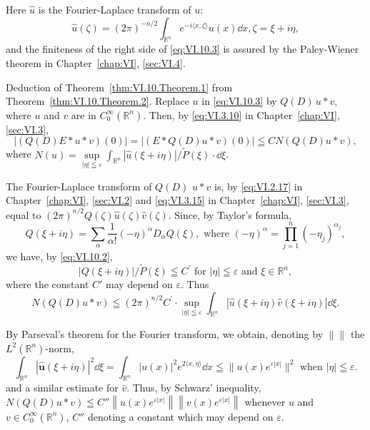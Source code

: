 Here $\hat{u}$ is the Fourier-Laplace transform of $u$: 
\[
\hat {u} (\zeta) = (2 \pi) ^{-n/2} \int_ {\mathbb{R}^{n}} e ^{- i \langle x, \zeta \rangle} u (x) \dd x, \zeta = \xi + i \eta ,
\]
and the finiteness of the right side of \eqref{eq:VI.10.3} is assured by the Paley-Wiener theorem in Chapter~\ref{chap:VI}, \ref{sec:VI.4}. 

Deduction of Theorem~\ref{thm:VI.10.Theorem.1} from Theorem~\ref{thm:VI.10.Theorem.2}. Replace $u$ in \eqref{eq:VI.10.3} by $Q(D) \, u * v$, where $u$ and $v$ are in $C_0^\infty(\mathbb{R}^{n})$. Then, by \eqref{eq:VI.3.10} in Chapter~\ref{chap:VI}, \ref{sec:VI.3}, 
\[
\left| (Q (D) E * u * v) (0) \right| = \left| (E * Q (D) u * v) (0) \right| \leqq C N (Q (D) u * v),
\]
where $N(u) = \sup\limits_{|\eta| \leqq \varepsilon} \int_{\mathbb{R}^{n}} |\hat{u}(\xi + i\eta)| / \tilde{P}(\xi) \cdot \dd\xi$. 

The Fourier-Laplace transform of $Q(D)$ $u * v$ is, by \eqref{eq:VI.2.17} in Chapter~\ref{chap:VI}, \ref{sec:VI.2} and \eqref{eq:VI.3.15} in Chapter~\ref{chap:VI}, \ref{sec:VI.3}, equal to $(2\pi)^{n/2} Q(\zeta) \hat{u}(\zeta) \hat{v}(\zeta)$. Since, by Taylor's formula, 
\begin{equation}\label{eq:VI.10.4}
Q (\xi + i \eta) = \sum\limits_{\alpha} \frac {1}{\alpha !} (- \eta) ^{\alpha} D _{\alpha} Q (\xi), \text{ where } (- \eta) ^{\alpha} = \prod\limits_{j=1} ^{n} (- \eta_{j}) ^ {\alpha_{j}},
\end{equation}
we have, by \eqref{eq:VI.10.2}, 
\[
\left| Q (\xi + i \eta) \right| / \tilde {P} (\xi) \leqq C ^{\prime} \text{ for } | \eta | \leqq \varepsilon \text{ and } \xi \in \mathbb{R}^{n},
\]
where the constant $C'$ may depend on $\varepsilon$. Thus 
\[
N (Q (D) u * v) \leqq (2 \pi) ^{n/2} C ^{\prime} \cdot \sup\limits _{| \eta | \leqq \varepsilon} \int_ {\mathbb{R}^{n}} | \hat {u} (\xi + i \eta) \hat {v} (\xi + i \eta) | \dd \xi .
\]

By Parseval's theorem for the Fourier transform, we obtain, denoting by $\|\|$ the $L^2(\mathbb{R}^{n})$-norm, 
\[
\int_ {\mathbb{R}^{n}} | \hat {\boldsymbol {u}} (\xi + i \eta) | ^{2} \dd \xi = \int_ {\mathbb{R}^{n}} | u (x) | ^{2} e ^{2 \langle x, \eta \rangle} \dd x \leqq \| u (x) e ^{\varepsilon | x |} \| ^{2} \text{ when } | \eta | \leqq \varepsilon .
\]
and a similar estimate for $\hat{v}$. Thus, by Schwarz' inequality, 
$N(Q(D)u*v)\leqq C''\left\|u(x)e^{\varepsilon|x|}\right\|\left\|v(x)e^{\varepsilon|x|}\right\|$ whenever $u$ and $v\in C_{0}^{\infty}(\mathbb{R}^{n})$, $C''$ denoting a constant which may depend on $\varepsilon$. 

